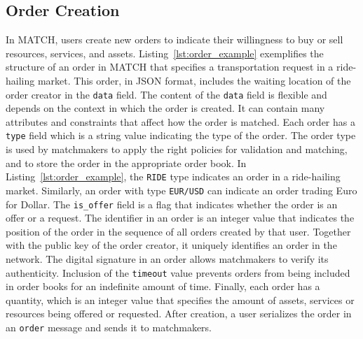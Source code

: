 \subsection{Order Creation}
\label{sec:order_creation}
In MATCH, users create new orders to indicate their willingness to buy or sell resources, services, and assets.
Listing~\ref{lst:order_example} exemplifies the structure of an order in MATCH that specifies a transportation request in a ride-hailing market.
This order, in JSON format, includes the waiting location of the order creator in the \texttt{data} field.
The content of the \texttt{data} field is flexible and depends on the context in which the order is created.
It can contain many attributes and constraints that affect how the order is matched.
Each order has a \texttt{type} field which is a string value indicating the type of the order.
The order type is used by matchmakers to apply the right policies for validation and matching, and to store the order in the appropriate order book.
In Listing~\ref{lst:order_example}, the \texttt{RIDE} type indicates an order in a ride-hailing market.
Similarly, an order with type \texttt{EUR/USD} can indicate an order trading Euro for Dollar.
The \texttt{is\_offer} field is a flag that indicates whether the order is an offer or a request.
The identifier in an order is an integer value that indicates the position of the order in the sequence of all orders created by that user.
Together with the public key of the order creator, it uniquely identifies an order in the network.
The digital signature in an order allows matchmakers to verify its authenticity.
Inclusion of the \texttt{timeout} value prevents orders from being included in order books for an indefinite amount of time.
Finally, each order has a quantity, which is an integer value that specifies the amount of assets, services or resources being offered or requested.
After creation, a user serializes the order in an \texttt{order} message and sends it to matchmakers.


